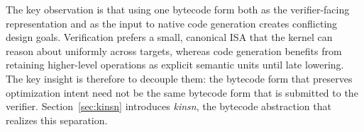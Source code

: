 The key observation is that using one bytecode form both as the verifier-facing representation and as the input to native code generation creates conflicting design goals. Verification prefers a small, canonical ISA that the kernel can reason about uniformly across targets, whereas code generation benefits from retaining higher-level operations as explicit semantic units until late lowering. The key insight is therefore to decouple them: the bytecode form that preserves optimization intent need not be the same bytecode form that is submitted to the verifier. Section~\ref{sec:kinsn} introduces \emph{kinsn}, the bytecode abstraction that realizes this separation.
